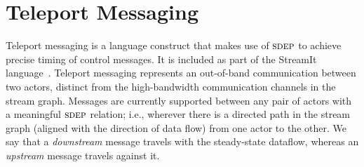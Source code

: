 \section{Teleport Messaging}
\label{sec:teleport}


Teleport messaging is a language construct that makes use of $\textsc{sdep}$
to achieve precise timing of control messages.  It is included as part
of the StreamIt language~\cite{streamitcc}.  Teleport messaging
represents an out-of-band communication between two actors, distinct
from the high-bandwidth communication channels in the stream graph.
Messages are currently supported between any pair of actors with a
meaningful $\textsc{sdep}$ relation; i.e., wherever there is a directed path
in the stream graph (aligned with the direction of data flow) from one
actor to the other.  We say that a {\it downstream} message travels
with the steady-state dataflow, whereas an {\it upstream} message
travels against it.

